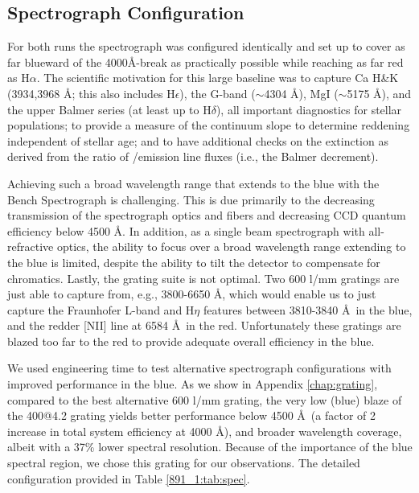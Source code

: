 \subsection{Spectrograph Configuration}

For both runs the spectrograph was configured identically and set up
to cover as far blueward of the 4000\AA-break as practically possible
while reaching as far red as H$\alpha$.  The scientific motivation for
this large baseline was to capture Ca H\&K (3934,3968 \AA; this also
includes H$\epsilon$), the G-band ($\sim$4304 \AA), MgI ($\sim$5175
\AA), and the upper Balmer series (at least up to H$\delta$), all
important diagnostics for stellar populations; to provide a measure of
the continuum slope to determine reddening independent of stellar age;
and to have additional checks on the extinction as derived from the
ratio of \Ha/\HB emission line fluxes (i.e., the Balmer decrement).

Achieving such a broad wavelength range that extends to the blue with
the Bench Spectrograph is challenging. This is due primarily to the
decreasing transmission of the spectrograph optics and fibers and
decreasing CCD quantum efficiency below 4500 \AA. In addition, as a
single beam spectrograph with all-refractive optics, the ability to
focus over a broad wavelength range extending to the blue is limited,
despite the ability to tilt the detector to compensate for chromatics.
Lastly, the grating suite is not optimal. Two 600 l/mm gratings are
just able to capture from, e.g., 3800-6650 \AA, which would enable us
to just capture the Fraunhofer L-band and H$\eta$ features between
3810-3840 \AA\ in the blue, and the redder [NII] line at 6584 \AA\ in the
red. Unfortunately these gratings are blazed too far to the red to
provide adequate overall efficiency in the blue.

We used engineering time to test alternative spectrograph
configurations with improved performance in the blue.  As we show in
Appendix \ref{chap:grating}, compared to the best alternative 600 l/mm
grating, the very low (blue) blaze of the 400@4.2 grating yields
better performance below 4500 \AA\ (a factor of 2 increase in total
system efficiency at 4000 \AA), and broader wavelength coverage,
albeit with a 37\% lower spectral resolution. Because of the
importance of the blue spectral region, we chose this grating for our
observations. The detailed configuration provided in Table
\ref{891_1:tab:spec}.


